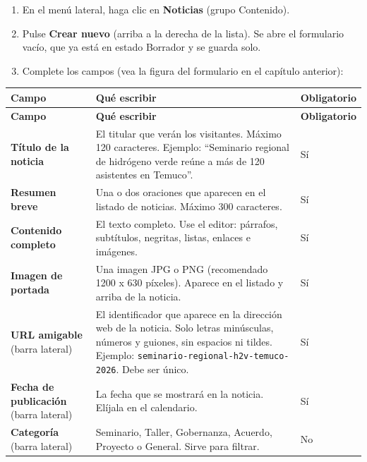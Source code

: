 \documentclass[11pt,letterpaper]{report}
\begin{document}
\begin{enumerate}
  \item En el menú lateral, haga clic en \textbf{Noticias} (grupo Contenido).
  \item Pulse \textbf{Crear nuevo} (arriba a la derecha de la lista). Se abre el formulario vacío, que ya está en estado Borrador y se guarda solo.
  \item Complete los campos (vea la figura del formulario en el capítulo anterior):
\end{enumerate}
\begin{longtable}{>{\raggedright\arraybackslash}p{}>{\raggedright\arraybackslash}p{}>{\raggedright\arraybackslash}p{}}
\rowcolor{h2vazul}\textbf{\color{white}Campo} & \textbf{\color{white}Qué escribir} & \textbf{\color{white}Obligatorio} \\
\endfirsthead
\rowcolor{h2vazul}\textbf{\color{white}Campo} & \textbf{\color{white}Qué escribir} & \textbf{\color{white}Obligatorio} \\
\endhead
\textbf{Título de la noticia} & El titular que verán los visitantes. Máximo 120 caracteres. Ejemplo: “Seminario regional de hidrógeno verde reúne a más de 120 asistentes en Temuco”. & Sí \\ \midrule
\rowcolor{filaalt}\textbf{Resumen breve} & Una o dos oraciones que aparecen en el listado de noticias. Máximo 300 caracteres. & Sí \\ \midrule
\textbf{Contenido completo} & El texto completo. Use el editor: párrafos, subtítulos, negritas, listas, enlaces e imágenes. & Sí \\ \midrule
\rowcolor{filaalt}\textbf{Imagen de portada} & Una imagen JPG o PNG (recomendado 1200 x 630 píxeles). Aparece en el listado y arriba de la noticia. & Sí \\ \midrule
\textbf{URL amigable} (barra lateral) & El identificador que aparece en la dirección web de la noticia. Solo letras minúsculas, números y guiones, sin espacios ni tildes. Ejemplo: \texttt{seminario-regional-h2v-temuco-2026}. Debe ser único. & Sí \\ \midrule
\rowcolor{filaalt}\textbf{Fecha de publicación} (barra lateral) & La fecha que se mostrará en la noticia. Elíjala en el calendario. & Sí \\ \midrule
\textbf{Categoría} (barra lateral) & Seminario, Taller, Gobernanza, Acuerdo, Proyecto o General. Sirve para filtrar. & No \\ \bottomrule
\end{longtable}
\end{document}
